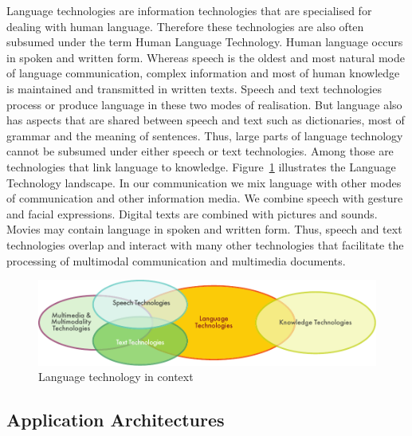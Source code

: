 \documentclass[]{../../metanetpaper}
\begin{document}
\begin{multicols}{2}

Language technologies are information technologies that are specialised for dealing with human language. Therefore these technologies are also often subsumed under the term Human Language Technology. Human language occurs in spoken and written form. Whereas speech is the oldest and most natural mode of language communication, complex information and most of human knowledge is maintained and transmitted in written texts. Speech and text technologies process or produce language in these two modes of realisation. But language also has aspects that are shared between speech and text such as dictionaries, most of grammar and the meaning of sentences. Thus, large parts of language technology cannot be subsumed under either speech or text technologies. Among those are technologies that link language to knowledge. Figure~\ref{fig:ltincontext_en}  illustrates the Language Technology landscape. In our communication we mix language with other modes of communication and other information media. We combine speech with gesture and facial expressions. Digital texts are combined with pictures and sounds. Movies may contain language in spoken and written form. Thus, speech and text technologies overlap and interact with many other technologies that facilitate the processing of multimodal communication and multimedia documents.  

\begin{figure}[htb]
  \center
  \includegraphics[width=\textwidth]{../_media/english/language_technologies}
  \caption{Language technology in context}
  \label{fig:ltincontext_en}
\end{figure}


\subsection{Application Architectures}


\end{multicols}
\end{document}
